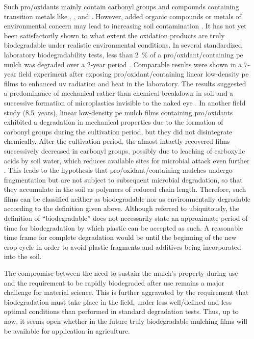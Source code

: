 Such pro\-/oxidants mainly contain carbonyl groups and compounds containing transition metals like , , and  \citep{KyrikouBiodegradation2007}. However, added organic compounds or metals of environmental concern may lead to increasing soil contamination \citep{KoutnyBiodegradation2006,Scarascia-MugnozzaPlastic2011}. It has not yet been satisfactorily shown to what extent the oxidation products are truly biodegradable under realistic environmental conditions. In several standardized laboratory biodegradability tests, less than \SI{2}{\percent} of a pro\-/oxidant\-/containing \ac{pe} mulch was degraded over a \num{2}-year period \citep{FeuilloleyDegradation2005}. Comparable results were shown in a \num{7}-year field experiment after exposing pro\-/oxidant\-/containing linear low-density \ac{pe} films to enhanced \ac{uv} radiation and heat in the laboratory. The results suggested a predominance of mechanical rather than chemical breakdown in soil and a successive formation of microplastics invisible to the naked eye \citep{BriassoulisDegradation2015}. In another field study (\num{8.5}~years), linear low-density \ac{pe} mulch films containing pro\-/oxidants exhibited a degradation in mechanical properties due to the formation of carbonyl groups during the cultivation period, but they did not disintegrate chemically. After the cultivation period, the almost intactly recovered films successively decreased in carbonyl groups, possibly due to leaching of carboxylic acids by soil water, which reduces available sites for microbial attack even further \citep{BriassoulisAnalysis2015}. This leads to the hypothesis that pro\-/oxidant\-/containing mulches undergo fragmentation but are not subject to subsequent microbial degradation, so that they accumulate in the soil as polymers of reduced chain length. Therefore, such films can be classified neither as biodegradable nor as environmentally degradable according to the definition given above. Although referred to ubiquitously, the definition of ``biodegradable'' does not necessarily state an approximate period of time for biodegradation by which plastic can be accepted as such. A reasonable time frame for complete degradation would be until the beginning of the new crop cycle in order to avoid plastic fragments and additives being incorporated into the soil.

The compromise between the need to sustain the mulch's property during use and the requirement to be rapidly biodegraded after use remains a major challenge for material science. This is further aggravated by the requirement that biodegradation must take place in the field, under less well\-/defined and less optimal conditions than performed in standard degradation tests. Thus, up to now, it seems open whether in the future truly biodegradable mulching films will be available for application in agriculture.

